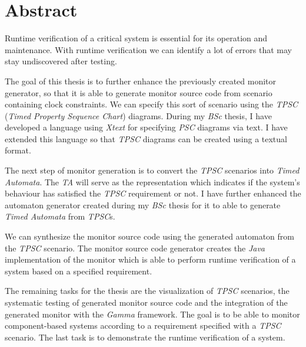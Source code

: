 \vfill
\selectenglish


\chapter*{Abstract}

Runtime verification of a critical system is essential for its operation and maintenance.
With runtime verification we can identify a lot of errors that may stay undiscovered after testing.

The goal of this thesis is to further enhance the previously created monitor generator, so that it is able to generate monitor source code from scenario containing clock constraints.
We can specify this sort of scenario using the \textit{TPSC} (\textit{Timed Property Sequence Chart}) diagrams.
During my \textit{BSc} thesis, I have developed a language using \textit{Xtext} for specifying \textit{PSC} diagrams via text.
I have extended this language so that \textit{TPSC} diagrams can be created using a textual format.

The next step of monitor generation is to convert the \textit{TPSC} scenarios into \textit{Timed Automata}.
The \textit{TA} will serve as the representation which indicates if the system's behaviour has satisfied the \textit{TPSC} requirement or not.
I have further enhanced the automaton generator created during my \textit{BSc} thesis for it to able to generate \textit{Timed Automata} from \textit{TPSC}s.

We can synthesize the monitor source code using the generated automaton from the \textit{TPSC} scenario.
The monitor source code generator creates the \textit{Java} implementation of the monitor which is able to perform runtime verification of a system based on a specified requirement.

The remaining tasks for the thesis are the visualization of \textit{TPSC} scenarios, the systematic testing of generated monitor source code and the integration of the generated monitor with the \textit{Gamma} framework.
The goal is to be able to monitor component-based systems according to a requirement specified with a \textit{TPSC} scenario.
The last task is to demonstrate the runtime verification of a system.

\vfill
\selectthesislanguage

\setcounter{romanPage}{\value{page}}
